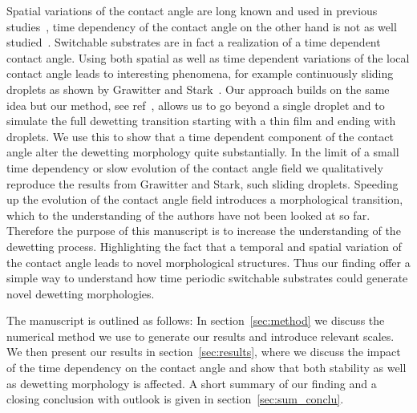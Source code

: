 \documentclass[twocolumn,amsmath,amssymb,showpacs,pre,nofootinbib,superscriptaddress]{revtex4-1} %
\begin{document}
Spatial variations of the contact angle are long known and used in previous studies~\cite{PhysRevE.91.023013, Sommers_2006}, time dependency of the contact angle on the other hand is not as well studied~\cite{suman2006dynamics}. 
Switchable substrates are in fact a realization of a time dependent contact angle. 
Using both spatial as well as time dependent variations of the local contact angle leads to interesting phenomena, for example continuously sliding droplets as shown by Grawitter and Stark~\cite{D0SM02082F}.  
Our approach builds on the same idea but our method, see ref~\cite{PhysRevE.100.033313}, allows us to go beyond a single droplet and to simulate the full dewetting transition starting with a thin film and ending with droplets.
We use this to show that a time dependent component of the contact angle alter the dewetting morphology quite substantially.
In the limit of a small time dependency or slow evolution of the contact angle field we qualitatively reproduce the results from Grawitter and Stark, such sliding droplets.
Speeding up the evolution of the contact angle field introduces a morphological transition, which to the understanding of the authors have not been looked at so far.
Therefore the purpose of this manuscript is to increase the understanding of the dewetting process.
Highlighting the fact that a temporal and spatial variation of the contact angle leads to novel morphological structures.
Thus our finding offer a simple way to understand how time periodic switchable substrates could generate novel dewetting morphologies.

The manuscript is outlined as follows:
In section~\ref{sec:method} we discuss the numerical method we use to generate our results and introduce relevant scales.
We then present our results in section~\ref{sec:results}, where we discuss the impact of the time dependency on the contact angle and show that both stability as well as dewetting morphology is affected.
A short summary of our finding and a closing conclusion with outlook is given in section~\ref{sec:sum_conclu}.
\end{document}
